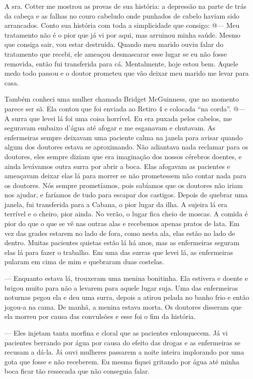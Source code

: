 A sra. Cotter me mostrou as provas de sua história: a depressão na parte
de trás da cabeça e as falhas no couro cabeludo onde punhados de cabelo
haviam sido arrancados. Conto sua história com toda a simplicidade que
consigo: @--- Meu tratamento não é o pior que já vi por aqui, mas
arruinou minha saúde. Mesmo que consiga sair, vou estar destruída.
Quando meu marido ouviu falar do tratamento que recebi, ele ameaçou
desmascarar esse lugar se eu não fosse removida, então fui transferida
para cá. Mentalmente, hoje estou bem. Aquele medo todo passou e o doutor
prometeu que vão deixar meu marido me levar para casa.

Também conheci uma mulher chamada Bridget McGuinness, que no momento
parece ser sã. Ela contou que foi enviada ao Retiro 4 e colocada ``na
corda''. @--- A surra que levei lá foi uma coisa horrível. Eu era puxada
pelos cabelos, me seguravam embaixo d'água até afogar e me esganavam e
chutavam. As enfermeiras sempre deixavam uma paciente calma na janela
para avisar quando algum dos doutores estava se aproximando. Não
adiantava nada reclamar para os doutores, eles sempre diziam que era
imaginação dos nossos cérebros doentes, e ainda levávamos outra surra
por abrir a boca. Elas afogavam as pacientes e ameaçavam deixar elas lá
para morrer se não prometessem não contar nada para os doutores. Nós
sempre prometíamos, pois sabíamos que os doutores não iriam nos ajudar,
e faríamos de tudo para escapar dos castigos. Depois de quebrar uma
janela, fui transferida para a Cabana, o pior lugar da ilha. A sujeira
lá era terrível e o cheiro, pior ainda. No verão, o lugar fica cheio de
moscas. A comida é pior do que o que se vê nas outras alas e recebemos
apenas pratos de lata. Em vez das grades estarem no lado de fora, como
nesta ala, elas estão no lado de dentro. Muitas pacientes quietas estão
lá há anos, mas as enfermeiras seguram elas lá para fazer o trabalho. Em
uma das surras que levei lá, as enfermeiras pularam em cima de mim e
quebraram duas costelas.

--- Enquanto estava lá, trouxeram uma menina bonitinha. Ela estivera e
doente e brigou muito para não a levarem para aquele lugar suja. Uma das
enfermeiras noturnas pegou ela e deu uma surra, depois a atirou pelada
no banho frio e então jogou-a na cama. De manhã, a menina estava morta.
Os doutores disseram que ela morreu por causa das convulsões e esse foi
o fim da história.

--- Eles injetam tanta morfina e cloral que as pacientes enlouquecem. Já
vi pacientes berrando por água por causa do efeito das drogas e as
enfermeiras se recusam a dá-la. Já ouvi mulheres passarem a noite
inteira implorando por uma gota que fosse e não receberem. Eu mesma
fiquei gritando por água até minha boca ficar tão ressecada que não
conseguia falar.

